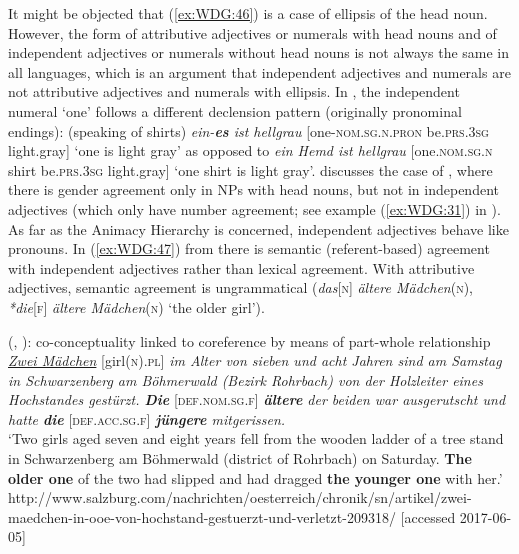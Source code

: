 \documentclass[output=collectionpaper]{langsci/langscibook}
\begin{document}
It might be objected that (\ref{ex:WDG:46}) is a case of ellipsis of the head noun. However, the form of attributive adjectives or numerals with head nouns and of independent adjectives or numerals without head nouns is not always the same in all languages, which is an argument that independent adjectives and numerals are not attributive adjectives and numerals with ellipsis. In , the independent numeral `one' follows a different declension pattern (originally pronominal endings): (speaking of shirts) \textit{ein-\textbf{es} ist hellgrau} [one-\textsc{nom.sg.n.pron} be.\textsc{prs.3sg} light.gray] `one is light gray' as opposed to \textit{ein Hemd ist hellgrau} [one.\textsc{nom.sg.n} shirt be.\textsc{prs.3sg} light.gray] `one shirt is light gray'. \cite{Waelchli2017} discusses the case of , where there is gender agreement only in NPs with head nouns, but not in independent adjectives (which only have number agreement; see example (\ref{ex:WDG:31}) in ). As far as the Animacy Hierarchy is concerned, independent adjectives behave like pronouns. In (\ref{ex:WDG:47}) from  there is semantic (referent-based) agreement with independent adjectives rather than lexical agreement. With attributive adjectives, semantic agreement is ungrammatical (\textit{das}[\textsc{n}] \textit{ältere Mädchen}(\textsc{n}), \textit{*die}[\textsc{f}] \textit{ältere Mädchen}(\textsc{n}) `the older girl').

\ea\label{ex:WDG:47}
 (, ): co-conceptuality linked to coreference by means of part-whole relationship\\
\textit{\uline{Zwei Mädchen}} [girl\textsc{(n).pl}] \textit{im Alter von sieben und acht Jahren sind am Samstag in Schwarzenberg am Böhmerwald (Bezirk Rohrbach) von der Holzleiter eines Hochstandes gestürzt. \textbf{Die}} [\textsc{def.nom.sg.f}] \textit{\textbf{ältere} der beiden war ausgerutscht und hatte \textbf{die}} [\textsc{def.acc.sg.f}] \textit{\textbf{jüngere} mitgerissen.}\\
	`Two girls aged seven and eight years fell from the wooden ladder of a tree stand in Schwarzenberg am Böhmerwald (district of Rohrbach) on Saturday. \textbf{The older one} of the two had slipped and had dragged \textbf{the younger one} with her.'\\
	http://www.salzburg.com/nachrichten/oesterreich/chronik/sn/artikel/zwei-maedchen-in-ooe-von-hochstand-gestuerzt-und-verletzt-209318/ [accessed 2017-06-05]\\
  \z
\end{document}
